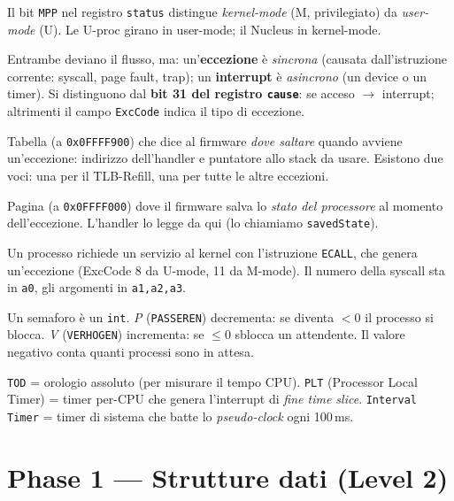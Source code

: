 \documentclass[11pt,a4paper]{article}
\newcommand{\code}[1]{\texttt{#1}}
\begin{document}
\begin{description}[style=nextline,leftmargin=0pt]
\item[Kernel vs user mode] Il bit \code{MPP} nel registro \code{status}
  distingue \emph{kernel-mode} (M, privilegiato) da \emph{user-mode} (U). Le
  U-proc girano in user-mode; il Nucleus in kernel-mode.
\item[Eccezione vs interrupt] Entrambe deviano il flusso, ma: un'\textbf{eccezione}
  è \emph{sincrona} (causata dall'istruzione corrente: syscall, page fault,
  trap); un \textbf{interrupt} è \emph{asincrono} (un device o un timer). Si
  distinguono dal \textbf{bit 31 del registro \code{cause}}: se acceso $\to$
  interrupt; altrimenti il campo \code{ExcCode} indica il tipo di eccezione.
\item[Pass Up Vector] Tabella (a \code{0x0FFFF900}) che dice al firmware
  \emph{dove saltare} quando avviene un'eccezione: indirizzo dell'handler e
  puntatore allo stack da usare. Esistono due voci: una per il TLB-Refill, una
  per tutte le altre eccezioni.
\item[BIOSDATAPAGE] Pagina (a \code{0x0FFFF000}) dove il firmware salva lo
  \emph{stato del processore} al momento dell'eccezione. L'handler lo legge da
  qui (lo chiamiamo \code{savedState}).
\item[SYSCALL / ECALL] Un processo richiede un servizio al kernel con
  l'istruzione \code{ECALL}, che genera un'eccezione (ExcCode 8 da U-mode,
  11 da M-mode). Il numero della syscall sta in \code{a0}, gli argomenti in
  \code{a1,a2,a3}.
\item[Semafori a contatore negativo] Un semaforo è un \code{int}. \emph{P}
  (\code{PASSEREN}) decrementa: se diventa $<0$ il processo si blocca. \emph{V}
  (\code{VERHOGEN}) incrementa: se $\le 0$ sblocca un attendente. Il valore
  negativo conta quanti processi sono in attesa.
\item[TOD / PLT / Interval Timer] \code{TOD} = orologio assoluto (per misurare
  il tempo CPU). \code{PLT} (Processor Local Timer) = timer per-CPU che genera
  l'interrupt di \emph{fine time slice}. \code{Interval Timer} = timer di
  sistema che batte lo \emph{pseudo-clock} ogni 100\,ms.
\end{description}

\section{Phase 1 --- Strutture dati (Level 2)}
\end{document}
